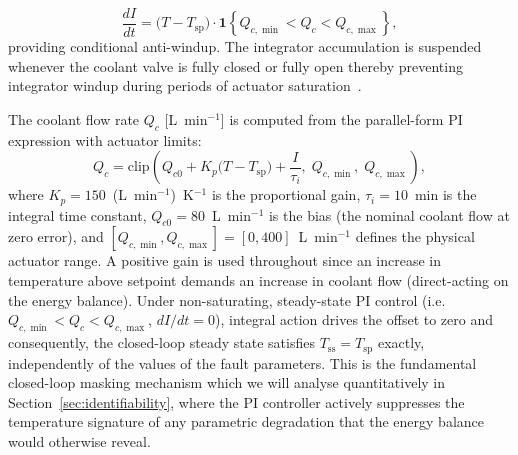 \documentclass[aps,pre,twocolumn,superscriptaddress]{revtex4-2}
\begin{document}
\begin{equation}    
\label{eq:closed_loop}
  \frac{dI}{dt} = \bigl(T - T_\mathrm{sp}\bigr)\cdot
       \mathbf{1}\!\left\{Q_{c,\min} < Q_c < Q_{c,\max}\right\},
\end{equation}
providing conditional anti-windup. The integrator accumulation is suspended whenever
the coolant valve is fully closed or fully open thereby preventing integrator
windup during periods of actuator saturation~\citep{Seborg2011}.

The coolant flow rate $Q_c$ [L~min$^{-1}$] is computed from the
parallel-form PI expression with actuator limits:
%
\begin{equation}
  Q_c = \mathrm{clip}\!\left(
    Q_{c0} + K_p\bigl(T - T_\mathrm{sp}\bigr) + \frac{I}{\tau_i},\;
    Q_{c,\min},\;
    Q_{c,\max}
  \right),
  \label{eq:pi_law}
\end{equation}
%
where $K_p = 150$~(L~min$^{-1}$)~K$^{-1}$ is the proportional gain,
$\tau_i = 10$~min is the integral time constant, $Q_{c0} = 80$~L~min$^{-1}$
is the bias (the nominal coolant flow at zero error), and
$[Q_{c,\min}, Q_{c,\max}] = [0, 400]$~L~min$^{-1}$ defines the physical
actuator range.  A positive gain is used throughout since an increase in
temperature above setpoint demands an increase in coolant flow
(direct-acting on the energy balance).
Under non-saturating, steady-state PI control
(i.e.\ $Q_{c,\min} < Q_c < Q_{c,\max}$, $dI/dt = 0$), integral action
drives the offset to zero and consequently, the closed-loop steady state satisfies
$T_\mathrm{ss} = T_\mathrm{sp}$ exactly, independently of the values of
the fault parameters.
This is the fundamental closed-loop masking mechanism which we will analyse quantitatively in
Section~\ref{sec:identifiability}, where the PI controller actively suppresses
the temperature signature of any parametric degradation that the energy
balance would otherwise reveal.
\end{document}

